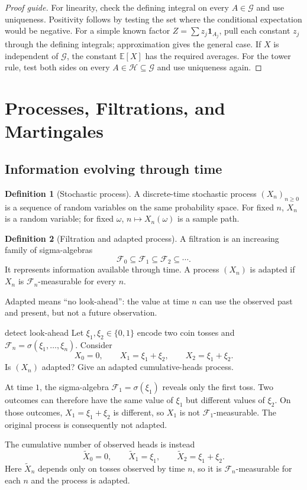 \documentclass[10pt]{article}
\newcommand{\E}{\mathbb E}
\newcommand{\1}{\mathbf 1}
\newcommand{\cF}{\mathcal F}
\newcommand{\cG}{\mathcal G}
\newcommand{\cH}{\mathcal H}
\theoremstyle{definition}
\newtheorem{definition}{Definition}[section]
\begin{document}
\begin{proof}[Proof guide]
For linearity, check the defining integral on every $A\in\cG$ and use
uniqueness. Positivity follows by testing the set where the conditional
expectation would be negative. For a simple known factor
$Z=\sum z_j\1_{A_j}$, pull each constant $z_j$ through the defining integrals;
approximation gives the general case. If $X$ is independent of $\cG$, the
constant $\E[X]$ has the required averages. For the tower rule, test both sides
on every $A\in\cH\subseteq\cG$ and use uniqueness again.
\end{proof}

\section{Processes, Filtrations, and Martingales}

\subsection{Information evolving through time}

\begin{definition}[Stochastic process]
A discrete-time stochastic process $(X_n)_{n\ge0}$ is a sequence of random
variables on the same probability space. For fixed $n$, $X_n$ is a random
variable; for fixed $\omega$, $n\mapsto X_n(\omega)$ is a sample path.
\end{definition}

\begin{definition}[Filtration and adapted process]
A filtration is an increasing family of sigma-algebras
\[
\cF_0\subseteq\cF_1\subseteq\cF_2\subseteq\cdots.
\]
It represents information available through time. A process $(X_n)$ is adapted
if $X_n$ is $\cF_n$-measurable for every $n$.
\end{definition}

Adapted means ``no look-ahead'': the value at time $n$ can use the observed
past and present, but not a future observation.

\begin{studentexercise}{detect look-ahead}
Let $\xi_1,\xi_2\in\{0,1\}$ encode two coin tosses and
$\cF_n=\sigma(\xi_1,\ldots,\xi_n)$. Consider
\[
X_0=0,
\qquad X_1=\xi_1+\xi_2,
\qquad X_2=\xi_1+\xi_2.
\]
Is $(X_n)$ adapted? Give an adapted cumulative-heads process.
\end{studentexercise}
\begin{shortsolution}
At time $1$, the sigma-algebra $\cF_1=\sigma(\xi_1)$ reveals only the first
toss. Two outcomes can therefore have the same value of $\xi_1$ but different
values of $\xi_2$. On those outcomes, $X_1=\xi_1+\xi_2$ is different, so
$X_1$ is not $\cF_1$-measurable. The original process is consequently not
adapted.

The cumulative number of observed heads is instead
\[
\widetilde X_0=0,
\qquad \widetilde X_1=\xi_1,
\qquad \widetilde X_2=\xi_1+\xi_2.
\]
Here $\widetilde X_n$ depends only on tosses observed by time $n$, so it is
$\cF_n$-measurable for each $n$ and the process is adapted.
\end{shortsolution}
\end{document}
